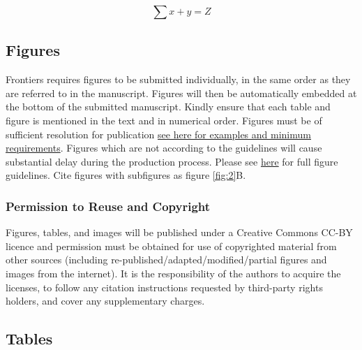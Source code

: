 \documentclass[utf8]{frontiersSCNS} %
\begin{document}
\begin{equation}
\sum x+ y =Z\label{eq:01}
\end{equation}

\subsection{Figures}

Frontiers requires figures to be submitted individually, in the same
order as they are referred to in the manuscript. Figures will then be
automatically embedded at the bottom of the submitted
manuscript. Kindly ensure that each table and figure is mentioned in
the text and in numerical order. Figures must be of sufficient
resolution for publication
\href{http://home.frontiersin.org/about/author-guidelines#ResolutionRequirements}{see
  here for examples and minimum requirements}. Figures which are not
according to the guidelines will cause substantial delay during the
production process. Please see
\href{http://home.frontiersin.org/about/author-guidelines#GeneralStyleGuidelinesforFigures}{here}
for full figure guidelines. Cite figures with subfigures as figure
\ref{fig:2}B.


\subsubsection{Permission to Reuse and Copyright}

Figures, tables, and images will be published under a Creative Commons
CC-BY licence and permission must be obtained for use of copyrighted
material from other sources (including
re-published/adapted/modified/partial figures and images from the
internet). It is the responsibility of the authors to acquire the
licenses, to follow any citation instructions requested by third-party
rights holders, and cover any supplementary charges.


\subsection{Tables}
\end{document}
